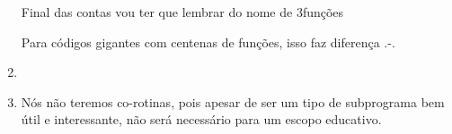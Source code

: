 \documentclass[12pt, a4paper]{article}
\begin{document}
\begin{enumerate}
			\begin{comment}
            Com sobrecarga:
            
            	int soma(int a, int b)
            {
            return a+b;
            }
            	
            	float soma(float a, float b)
            {
            return a+b;
            }
            
            	int soma(String a, String b)
            {
            return a^b;
            }
            
            	Final das contas, posso lembrar o nome de apenas uma função e fazer:
            
            	soma(1, 2);
            	soma(1.5, 2.5);
            	soma(“teste”, “ ftw”);	
            
            	Sem sobrecarga:
            	
            	int somaInt(int a, int b)
            {
            return a+b;
            }
            	
            	float somaFloat(float a, float b)
            {
            return a+b;
            }
            
            	int somaString(String a, String b)
            {
            return a^b;
            }
            \end{comment}
            	Final das contas vou ter que lembrar do nome de 3funções
            
            	Para códigos gigantes com centenas de funções, isso faz diferença .-.

            \item

            \item
            Nós não teremos co-rotinas, pois apesar de ser um tipo de subprograma bem útil e interessante, não será necessário para um escopo educativo.
        \end{enumerate}
\end{document}
